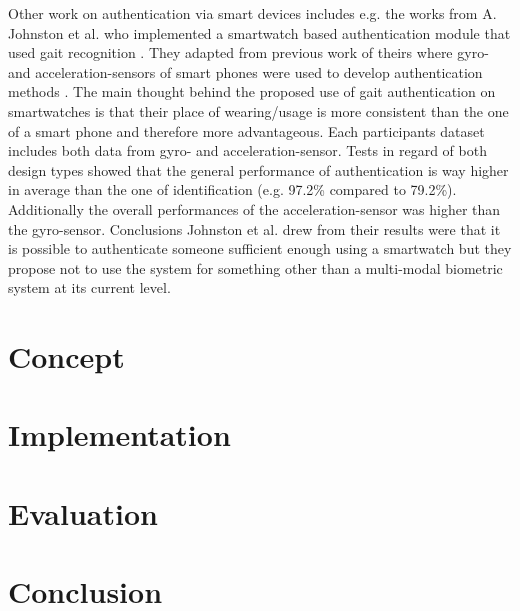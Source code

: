 \newline
\newline
Other work on authentication via smart devices includes e.g. the works from A. Johnston et al. who implemented a smartwatch based authentication module that used gait recognition \cite{johnston2015smartwatch}. They adapted from previous work of theirs where gyro- and acceleration-sensors of smart phones were used to develop authentication methods \cite{kwapisz2010cell}. The main thought behind the proposed use of gait authentication on smartwatches is that their place of wearing/usage is more consistent than the one of a smart phone and therefore more advantageous.
Each participants dataset includes both data from gyro- and acceleration-sensor. Tests in regard of both design types showed that the general performance of authentication is way higher in average than the one of identification (e.g. 97.2\% compared to 79.2\%). Additionally the overall performances of the acceleration-sensor was higher than the gyro-sensor.\newline
Conclusions Johnston et al. drew from their results were that it is possible to authenticate someone sufficient enough using a smartwatch but they propose not to use the system for something other than a multi-modal biometric system at its current level. 



\section{Concept}
\section{Implementation}
\section{Evaluation}
\section{Conclusion}

